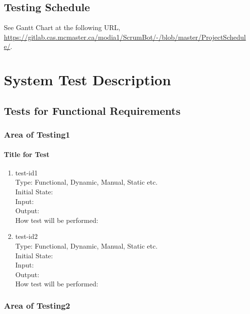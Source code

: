 \documentclass[12pt, titlepage]{article}
\begin{document}
\subsection{Testing Schedule}
See Gantt Chart at the following URL, \url{https://gitlab.cas.mcmaster.ca/modia1/ScrumBot/-/blob/master/ProjectSchedule/}.

\section{System Test Description}
\subsection{Tests for Functional Requirements}

\subsubsection{Area of Testing1}
        
\paragraph{Title for Test}

\begin{enumerate}

\item{test-id1}\\
Type: Functional, Dynamic, Manual, Static etc.\\
Initial State: \\
Input: \\
Output: \\
How test will be performed: \\

\item{test-id2}\\
Type: Functional, Dynamic, Manual, Static etc.\\
Initial State: \\
Input: \\
Output: \\
How test will be performed: \\

\end{enumerate}

\subsubsection{Area of Testing2}
\end{document}
